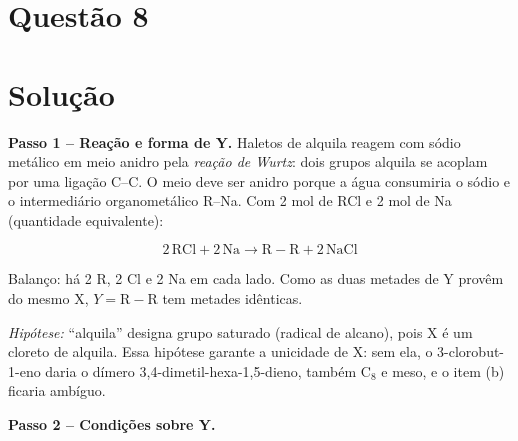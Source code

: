 \documentclass{article}%
\begin{document}
\section*{Questão 8}

\section*{Solução}

\textbf{Passo 1 -- Reação e forma de Y.} Haletos de alquila reagem com sódio metálico em meio anidro pela \emph{reação de Wurtz}: dois grupos alquila se acoplam por uma ligação C--C. O meio deve ser anidro porque a água consumiria o sódio e o intermediário organometálico R--Na. Com 2 mol de RCl e 2 mol de Na (quantidade equivalente):

\[
2\,\mathrm{RCl} + 2\,\mathrm{Na} \longrightarrow \mathrm{R{-}R} + 2\,\mathrm{NaCl}
\]

Balanço: há 2 R, 2 Cl e 2 Na em cada lado. Como as duas metades de Y provêm do mesmo X, $Y = \mathrm{R{-}R}$ tem metades idênticas.

\emph{Hipótese:} ``alquila'' designa grupo saturado (radical de alcano), pois X é um cloreto de alquila. Essa hipótese garante a unicidade de X: sem ela, o 3-clorobut-1-eno daria o dímero 3,4-dimetil-hexa-1,5-dieno, também C$_8$ e meso, e o item (b) ficaria ambíguo.

\textbf{Passo 2 -- Condições sobre Y.}
\end{document}
